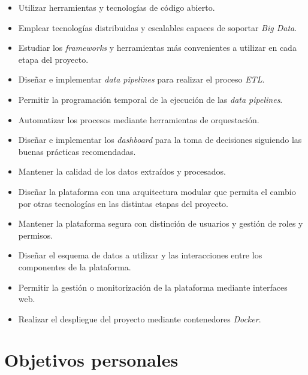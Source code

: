 \begin{itemize}
    \item Utilizar herramientas y tecnologías de código abierto.

    \item Emplear tecnologías distribuidas y escalables capaces de soportar \textit{Big Data}.

    \item Estudiar los \textit{frameworks} y herramientas más convenientes a utilizar en cada etapa del proyecto.

    \item Diseñar e implementar \textit{data pipelines} para realizar el proceso \textit{ETL}.

    \item Permitir la programación temporal de la ejecución de las \textit{data pipelines}.

    \item Automatizar los procesos mediante herramientas de orquestación.

    \item Diseñar e implementar los \textit{dashboard} para la toma de decisiones siguiendo las buenas prácticas recomendadas.

    \item Mantener la calidad de los datos extraídos y procesados.

    \item Diseñar la plataforma con una arquitectura modular que permita el cambio por otras tecnologías en las distintas etapas del proyecto.

    \item Mantener la plataforma segura con distinción de usuarios y gestión de roles y permisos.

    \item Diseñar el esquema de datos a utilizar y las interacciones entre los componentes de la plataforma.

    \item Permitir la gestión o monitorización de la plataforma mediante interfaces web.

    \item Realizar el despliegue del proyecto mediante contenedores \textit{Docker}.
\end{itemize}

\vspace{5cm}

\section{Objetivos personales}


